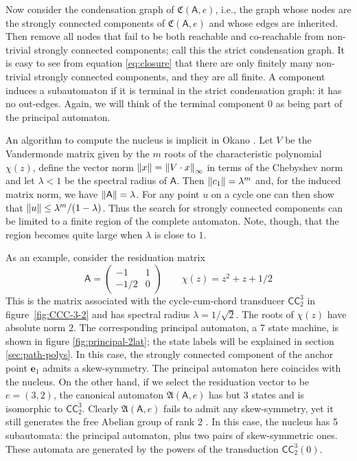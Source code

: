\documentclass[12pt]{svmult}
\def\CCC#1#2{\mathsf{CC}^{#1}_{#2}}
\def\AA{\mathsf{A}}             %
\def\cmpaut{\fC}                %
\def\fA{\mathfrak{A}}
\def\fC{\mathfrak{C}}           %
\def\unvo{\mathbf{e}_{1}}
\begin{document}
Now consider the condensation graph of $\cmpaut(\AA,e)$, i.e., the graph whose 
nodes are the strongly connected components of $\cmpaut(\AA,e)$ and whose edges are inherited. 
Then remove all nodes that fail to be both reachable and co-reachable from non-trivial 
strongly connected components; call this the strict condensation graph. 
It is easy to see from equation \eqref{eq:closure} that there are only finitely many 
non-trivial strongly connected components, and they are all finite. 
A component induces a subautomaton if it is terminal in the strict condensation graph: 
it has no out-edges. 
Again, we will think of the terminal component $0$ as being part of the principal automaton. 


An algorithm to compute the nucleus is implicit in Okano \cite{Okano15:thesis}. 
Let $V$ be the Vandermonde matrix given by the $m$ roots of the characteristic polynomial $\chi(z)$,
define the vector norm $\vnorm{x} = \vnorm*{V \cdot x}$ in terms of the Chebyshev norm 
and let $\lambda < 1$ be the spectral radius of $\AA$. 
Then $\vnorm{c_{1}} = \lambda^{m}$ and, for the induced matrix norm, we have 
$\vnorm{\AA} = \lambda$. 
For any point $u$ on a cycle one can then show that  $\vnorm{u} \leq \lambda^{m}/(1-\lambda)$.
Thus the search for strongly connected components can be limited to a finite region of 
the complete automaton.
Note, though, that the region becomes quite large when $\lambda$ is close to $1$.

As an example, consider the residuation matrix 
%
$$
    \AA = \begin{pmatrix} -1 & 1 \\ -1/2 & 0 \end{pmatrix}  \qquad  \chi(z) = z^{2} + z + 1/2
$$
%
This is the matrix associated with the cycle-cum-chord transducer $\CCC{3}{2}$ in 
figure~\ref{fig:CCC-3-2} and has spectral radius $\lambda = 1/\sqrt{2}$.
The roots of $\chi(z)$ have absolute norm $2$. 
The corresponding principal automaton, a 7 state machine, is shown in figure \ref{fig:principal-2lat}; 
the state labels will be explained in section \ref{sec:path-polys}. 
In this case, the strongly connected component of the anchor point $\unvo$ admits a skew-symmetry.
The principal automaton here coincides with the nucleus.  
On the other hand, if we select the residuation vector to be $e = (3,2)$, the canonical automaton 
$\fA(\AA,e)$ has but 3 states and is isomorphic to $\CCC{3}{2}$. 
Clearly $\fA(\AA,e)$ fails to admit any skew-symmetry, yet it still generates the free 
Abelian group of rank 2 \cite{SutnerLewi12:ibiv_jalc}.
In this case, the nucleus has 5 subautomata: the principal automaton, plus two pairs of 
skew-symmetric ones.
These automata are generated by the powers of the transduction $\CCC{3}{2}(0)$. 
\end{document}
